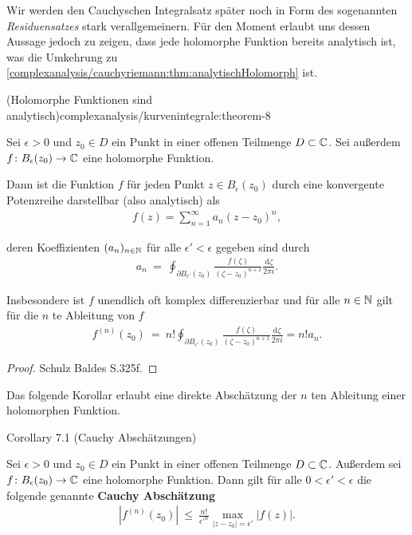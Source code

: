 \par
Wir werden den Cauchyschen Integralsatz später noch in Form des sogenannten \emph{Residuensatzes} stark verallgemeinern.
Für den Moment erlaubt uns dessen Aussage jedoch zu zeigen, dass jede holomorphe Funktion bereits analytisch ist, was die Umkehrung zu \cref{complexanalysis/cauchyriemann:thm:analytischHolomorph} ist.
\begin{theorem}{(Holomorphe Funktionen sind analytisch)}{complexanalysis/kurvenintegrale:theorem-8}



\par
Sei \(\epsilon > 0\) und \(z_0 \in D\) ein Punkt in einer offenen Teilmenge \(D \subset \mathbb{C}\).
Sei außerdem \(f \colon B_\epsilon(z_0) \rightarrow \mathbb{C}\) eine holomorphe Funktion.

\par
Dann ist die Funktion \(f\) für jeden Punkt \(z \in B_\epsilon(z_0)\) durch eine konvergente Potenzreihe darstellbar (also analytisch) als
\begin{align*}
f(z) = \sum_{n=1}^\infty a_n (z-z_0)^n,
\end{align*}
\par
deren Koeffizienten \((a_n)_{n\in\mathbb{N}}\) für alle \(\epsilon' < \epsilon\) gegeben sind durch
\begin{align*}
a_n \ = \ \oint_{\partial B_{\epsilon'}(z_0)} \frac{f(\zeta)}{(\zeta - z_0)^{n+1}} \frac{\mathrm{d}\zeta}{2\pi i}.
\end{align*}
\par
Insbesondere ist \(f\) unendlich oft komplex differenzierbar und für alle \(n \in \mathbb{N}\) gilt für die \(n\) te Ableitung von \(f\)
\begin{align*}
f^{(n)}(z_0) \ = \ n! \oint_{\partial B_{\epsilon'}(z_0)} \frac{f(\zeta)}{(\zeta - z_0)^{n+1}} \frac{\mathrm{d}\zeta}{2\pi i} = n! a_n.
\end{align*}\end{theorem}

\begin{proof}
 Schulz Baldes S.325f.
\end{proof}

\par
Das folgende Korollar erlaubt eine direkte Abschätzung der \(n\) ten Ableitung einer holomorphen Funktion.
\label{complexanalysis/kurvenintegrale:corollary-9}
\begin{emphBox}{}{}{Corollary 7.1 (Cauchy Abschätzungen)}



\par
Sei \(\epsilon > 0\) und \(z_0 \in D\) ein Punkt in einer offenen Teilmenge \(D \subset \mathbb{C}\).
Außerdem sei \(f \colon B_\epsilon(z_0) \rightarrow \mathbb{C}\) eine holomorphe Funktion.
Dann gilt für alle \(0 < \epsilon' < \epsilon\) die folgende genannte \textbf{Cauchy Abschätzung}
\begin{align*}
|f^{(n)}(z_0)| \ \leq \ \frac{n!}{\epsilon'^n} \max_{|z - z_0|=\epsilon'} |f(z)|.
\end{align*}\end{emphBox}


